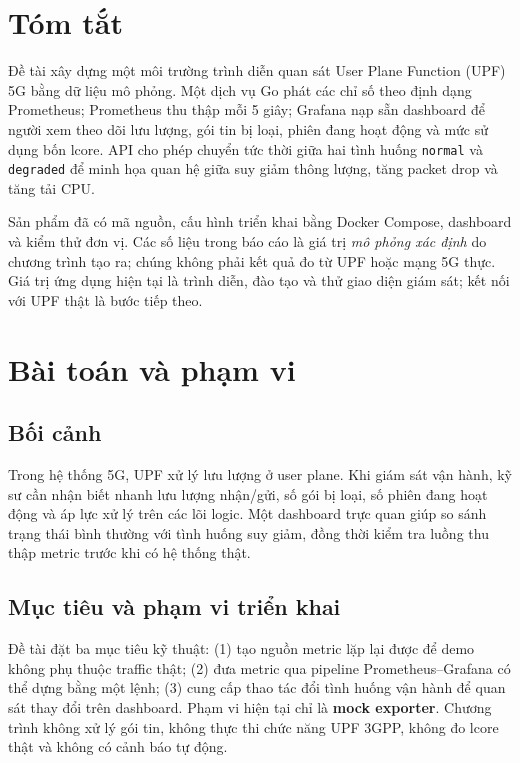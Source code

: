 \documentclass[12pt,a4paper]{report}
\newcommand{\code}[1]{\texttt{#1}}
\begin{document}


\chapter*{Tóm tắt}
Đề tài xây dựng một môi trường trình diễn quan sát User Plane Function (UPF) 5G bằng dữ liệu mô phỏng. Một dịch vụ Go phát các chỉ số theo định dạng Prometheus; Prometheus thu thập mỗi 5 giây; Grafana nạp sẵn dashboard để người xem theo dõi lưu lượng, gói tin bị loại, phiên đang hoạt động và mức sử dụng bốn lcore. API cho phép chuyển tức thời giữa hai tình huống \code{normal} và \code{degraded} để minh họa quan hệ giữa suy giảm thông lượng, tăng packet drop và tăng tải CPU.

Sản phẩm đã có mã nguồn, cấu hình triển khai bằng Docker Compose, dashboard và kiểm thử đơn vị. Các số liệu trong báo cáo là giá trị \emph{mô phỏng xác định} do chương trình tạo ra; chúng không phải kết quả đo từ UPF hoặc mạng 5G thực. Giá trị ứng dụng hiện tại là trình diễn, đào tạo và thử giao diện giám sát; kết nối với UPF thật là bước tiếp theo.

\tableofcontents

\chapter{Bài toán và phạm vi}
\section{Bối cảnh}
Trong hệ thống 5G, UPF xử lý lưu lượng ở user plane. Khi giám sát vận hành, kỹ sư cần nhận biết nhanh lưu lượng nhận/gửi, số gói bị loại, số phiên đang hoạt động và áp lực xử lý trên các lõi logic. Một dashboard trực quan giúp so sánh trạng thái bình thường với tình huống suy giảm, đồng thời kiểm tra luồng thu thập metric trước khi có hệ thống thật.

\section{Mục tiêu và phạm vi triển khai}
Đề tài đặt ba mục tiêu kỹ thuật: (1) tạo nguồn metric lặp lại được để demo không phụ thuộc traffic thật; (2) đưa metric qua pipeline Prometheus--Grafana có thể dựng bằng một lệnh; (3) cung cấp thao tác đổi tình huống vận hành để quan sát thay đổi trên dashboard. Phạm vi hiện tại chỉ là \textbf{mock exporter}. Chương trình không xử lý gói tin, không thực thi chức năng UPF 3GPP, không đo lcore thật và không có cảnh báo tự động.
\end{document}
